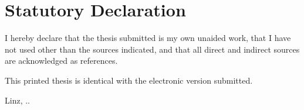 \def\place{Linz}
\def\date{\the\day.\the\month.\the\year}

\section*{Statutory Declaration}
I hereby declare that the thesis submitted is my own unaided work, that I have not used other than the sources indicated, and that all direct and indirect sources are acknowledged as references.

\bigskip\noindent
This printed thesis is identical with the electronic version submitted.

\vskip3cm
\noindent
\place, \date
